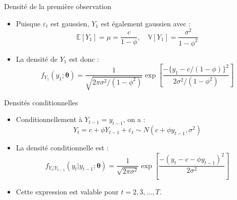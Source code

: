 \documentclass[11pt,aspectratio=169]{beamer}
\newcommand{\E}{\mathbb{E}}
\newcommand{\Var}{\mathbb{V}}
\begin{document}
\begin{frame}{Densité de la première observation}

\begin{itemize}

\item Puisque $\varepsilon_t$ est gaussien, $Y_1$ est également gaussien avec :
  \[
  \E[Y_1] = \mu = \frac{c}{1 - \phi}, \quad \Var[Y_1] = \frac{\sigma^2}{1 - \phi^2}
  \]\newline

\item La densité de $Y_1$ est donc :
  \[
  f_{Y_1}(y_1; \bm{\theta}) = \frac{1}{\sqrt{2\pi \sigma^2 / (1 - \phi^2)}} \exp\left[ \frac{-\{y_1 - c/(1 - \phi)\}^2}{2\sigma^2/(1 - \phi^2)} \right]
  \]

\end{itemize}

\end{frame}

\begin{frame}{Densités conditionnelles}

\begin{itemize}

\item Conditionnellement à $Y_{t-1} = y_{t-1}$, on a :
  \[
  Y_t = c + \phi Y_{t-1} + \varepsilon_t \sim N(c + \phi y_{t-1}, \sigma^2)
  \]\newline

\item La densité conditionnelle est :
  \[
  f_{Y_t | Y_{t-1}}(y_t | y_{t-1}; \bm{\theta}) = \frac{1}{\sqrt{2\pi\sigma^2}} \exp\left[ \frac{-(y_t - c - \phi y_{t-1})^2}{2\sigma^2} \right]
  \]\newline

\item Cette expression est valable pour $t = 2, 3, \ldots, T$.

\end{itemize}

\end{frame}
\end{document}
